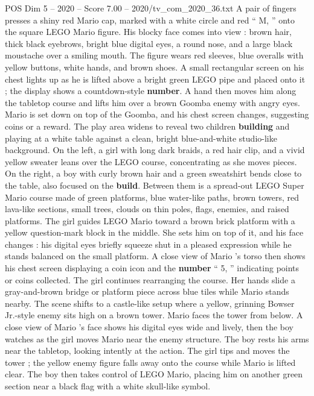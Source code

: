 \begin{textsample}{POS Dim 5 – 2020 – Score 7.00 – 2020/tv\_com\_2020\_36.txt}  \label{ex:f5_pos_066}
A pair of fingers presses a shiny red Mario cap, marked with a white circle and red “ M, ” onto the square LEGO Mario figure.
His blocky face comes into view : brown hair, thick black eyebrows, bright blue digital eyes, a round nose, and a large black moustache over a smiling mouth.
The figure wears red sleeves, blue overalls with yellow buttons, white hands, and brown shoes.
A small rectangular screen on his chest lights up as he is lifted above a bright green LEGO pipe and placed onto it ; the display shows a countdown-style \textbf{number}.
A hand then moves him along the tabletop course and lifts him over a brown Goomba enemy with angry eyes.
Mario is set down on top of the Goomba, and his chest screen changes, suggesting coins or a reward.
The play area widens to reveal two children \textbf{building} and playing at a white table against a clean, bright blue-and-white studio-like background.
On the left, a girl with long dark braids, a red hair clip, and a vivid yellow sweater leans over the LEGO course, concentrating as she moves pieces.
On the right, a boy with curly brown hair and a green sweatshirt bends close to the table, also focused on the \textbf{build}.
Between them is a spread-out LEGO Super Mario course made of green platforms, blue water-like paths, brown towers, red lava-like sections, small trees, clouds on thin poles, flags, enemies, and raised platforms.
The girl guides LEGO Mario toward a brown brick platform with a yellow question-mark block in the middle.
She sets him on top of it, and his face changes : his digital eyes briefly squeeze shut in a pleased expression while he stands balanced on the small platform.
A close view of Mario ’s torso then shows his chest screen displaying a coin icon and the \textbf{number} “ 5, ” indicating points or coins collected.
The girl continues rearranging the course.
Her hands slide a gray-and-brown bridge or platform piece across blue tiles while Mario stands nearby.
The scene shifts to a castle-like setup where a yellow, grinning Bowser Jr.-style enemy sits high on a brown tower.
Mario faces the tower from below.
A close view of Mario ’s face shows his digital eyes wide and lively, then the boy watches as the girl moves Mario near the enemy structure.
The boy rests his arms near the tabletop, looking intently at the action.
The girl tips and moves the tower ; the yellow enemy figure falls away onto the course while Mario is lifted clear.
The boy then takes control of LEGO Mario, placing him on another green section near a black flag with a white skull-like symbol.

\end{textsample}
